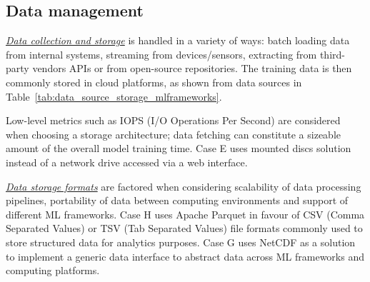 


\subsection{Data management}

\underline{\emph{Data collection and storage}}
is handled in a variety of ways: batch loading data from internal systems, streaming from devices/sensors, extracting from  third-party vendors APIs or from open-source repositories. The training data is then commonly stored in cloud platforms, as shown from data sources in Table~\ref{tab:data_source_storage_mlframeworks}.



Low-level metrics such as IOPS (I/O Operations Per Second) are considered when choosing a storage architecture; data fetching can constitute a sizeable amount of the overall model training time.  Case E uses mounted discs solution instead of a network drive accessed via a web interface. %

\underline{\emph{Data storage formats}} are factored when considering scalability of data processing pipelines, portability of data between computing environments and support of different ML frameworks. Case H uses Apache Parquet in favour of CSV (Comma Separated Values) or TSV (Tab Separated Values) file formats commonly used to store structured data for analytics purposes. Case G uses NetCDF as a solution to implement a generic data interface to abstract data across ML frameworks and computing platforms.


